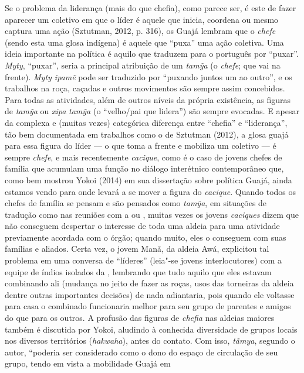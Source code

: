 Se o problema da liderança (mais do que chefia), como parece ser, é este
de fazer aparecer um coletivo em que o líder é aquele que inicia,
coordena ou mesmo captura uma ação (Sztutman, 2012, p. 316), os Guajá
lembram que o \emph{chefe} (sendo esta uma glosa indígena) é aquele que
``puxa'' uma ação coletiva. Uma ideia importante na política é aquilo
que traduzem para o português por ``puxar''. \emph{Myty}, ``puxar'',
seria a principal atribuição de um \emph{tamỹa} (o \emph{chefe}; que vai
na frente). \emph{Myty ipamẽ} pode ser traduzido por ``puxando juntos um
ao outro'', e os trabalhos na roça, caçadas e outros movimentos são
sempre assim concebidos. Para todas as atividades, além de outros níveis
da própria existência, as figuras de \emph{tamỹa} ou \emph{xipa}
\emph{tamỹa} (o ``velho/pai que lidera'') são sempre evocadas. E apesar
da complexa e (muitas vezes) categórica diferença entre ``chefia'' e
``liderança'', tão bem documentada em trabalhos como o de Sztutman
(2012), a glosa guajá para essa figura do líder --- o que toma a frente e
mobiliza um coletivo --- é sempre \emph{chefe}, e mais recentemente
\emph{cacique}, como é o caso de jovens chefes de família que acumulam
uma função no diálogo interétnico contemporâneo que, como bem mostrou
Yokoi (2014) em sua dissertação sobre política Guajá, ainda estamos
vendo para onde levará a se mover a figura do \emph{cacique}. Quando
todos os chefes de família se pensam e são pensados como \emph{tamỹa},
em situações de tradução como nas reuniões com a  ou , muitas
vezes os jovens \emph{caciques} dizem que não conseguem despertar o
interesse de toda uma aldeia para uma atividade previamente acordada com
o órgão; quando muito, eles o conseguem com suas famílias e aliados.
Certa vez, o jovem Manã, da aldeia Awá, explicitou tal problema
em uma conversa de ``líderes'' (leia"-se jovens interlocutores) com a
equipe de índios isolados da , lembrando que tudo aquilo que eles
estavam combinando ali (mudança no jeito de fazer as roças, usos das
torneiras da aldeia dentre outras importantes decisões) de nada
adiantaria, pois quando ele voltasse para casa o combinado funcionaria
melhor para seu grupo de parentes e amigos do que para os outros. A
profusão das figuras de \emph{chefia} nas aldeias maiores também é
discutida por Yokoi, aludindo à conhecida diversidade de grupos locais
nos diversos territórios (\emph{hakwaha}), antes do contato. Com isso,
\emph{tãmya}, segundo o autor, ``poderia ser considerado como o dono do
espaço de circulação de seu grupo, tendo em vista a mobilidade Guajá em
